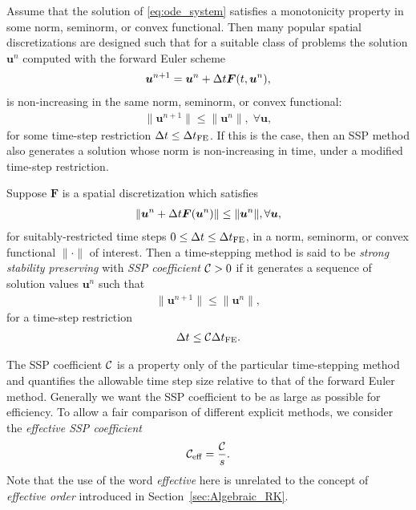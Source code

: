 Assume that the solution of \eqref{eq:ode_system} satisfies a monotonicity 
property in some norm, seminorm, or convex functional.
Then many popular spatial discretizations are designed such that for a 
suitable class of problems the solution $\bm{u}^{n}$ computed with the
forward Euler scheme
\begin{align}\label{eq:forwardEuler}
    \bm{u}^{n+1} = \bm{u}^{n} + \Delta t\bm{F}(t,\bm{u}^{n}),
\end{align}
is non-increasing in the same norm, seminorm, or convex functional:
\begin{align*}
    \|\bm{u}^{n+1}\| \le \|\bm{u}^n\|, \; \forall \bm{u},
\end{align*}
for some time-step restriction $\Delta t \leq \Delta t_{\text{FE}}$. 
If this is the case, then an SSP method also generates a solution whose norm is
non-increasing in time, under a modified time-step restriction. 
\begin{definition}
	Suppose $\bm{F}$ is a spatial discretization which satisfies
	\begin{align*}
		\|\bm{u}^{n} + \Delta t\bm{F}(\bm{u}^{n})\| \le \|\bm{u}^n\|, \forall \bm{u},
	\end{align*}
	for suitably-restricted time steps $0 \le \Delta t \le \Delta t_{\text{FE}}$,
	in a norm, seminorm, or convex functional $\|\cdot\|$ of interest.
	Then a time-stepping method is said to be \emph{strong stability
  	preserving} with \emph{SSP coefficient} $\mathcal{C} > 0$ if it
	generates a sequence of solution values $\bm{u}^n$ such that
	\begin{align*}
  		\|\bm{u}^{n+1}\| \le \|\bm{u}^n\|,
	\end{align*}
	for a time-step restriction
	\begin{align*}
		\Delta t \leq \mathcal{C} \Delta t_{\text{FE}}.
	\end{align*}
\end{definition} 

The SSP coefficient $\mathcal{C}$ is a property only of the particular 
time-stepping method and quantifies the allowable time step size relative 
to that of the forward Euler method.
Generally we want the SSP coefficient to be as large as possible for efficiency.
To allow a fair comparison of different explicit methods, we consider the 
\emph{effective SSP coefficient}
\begin{align*}
	\mathcal{C}_{\text{eff}} = \frac{\mathcal{C}}{s}.
\end{align*}
Note that the use of the word \emph{effective} here is unrelated to the 
concept of \emph{effective order} introduced in Section~\ref{sec:Algebraic_RK}.

